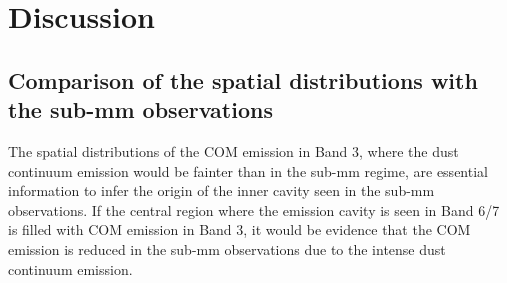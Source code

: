 \documentclass[twocolumn, twocolappendix, astrosymb, times]{aastex631}
\newcommand{\methanol}{CH$_3$OH\xspace}
\newcommand{\acetaldehyde}{CH$_3$CHO\xspace}
\newcommand{\methylformate}{CH$_3$OCHO\xspace}
\begin{document}





\section{Discussion} \label{sec:discussion}
\subsection{Comparison of the spatial distributions with the sub-mm observations}
The spatial distributions of the COM emission in Band 3, where the dust continuum emission would be fainter than in the sub-mm regime, are essential information to infer the origin of the inner cavity seen in the sub-mm observations. If the central region where the emission cavity is seen in Band 6/7 is filled with COM emission in Band 3, it would be evidence that the COM emission is reduced in the sub-mm observations due to the intense dust continuum emission. 
\end{document}
